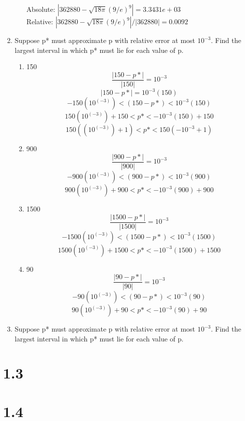 \documentclass{article}
\begin{document}
\begin{enumerate}
\begin{enumerate}
        Absolute: $|362880-\sqrt{18\pi}(9/e)^{9}| =3.3431e+03 $\\
         Relative: $|362880-\sqrt{18\pi}(9/e)^{9}|/|362880| = 0.0092$
    \end{enumerate}
    \item Suppose p* must approximate p with relative error at most $10^{-3}$. Find the largest interval in which p* must lie for each value of p. 
    \begin{enumerate}
        \item 150
        $$\frac{|150 - p*|}{|150|} = 10^{-3}$$
        $$|150 - p*| = 10^{-3}(150)$$
         $$-150(10^(-3)) < (150 - p*) < 10^{-3}(150)$$
         $$150(10^(-3)) + 150 < p* < -10^{-3}(150) + 150$$
         $$150((10^(-3)) + 1)< p* < 150(-10^{-3} + 1)$$
        \item 900
        $$\frac{|900 - p*|}{|900|} = 10^{-3}$$
        $$-900(10^(-3)) < (900 - p*) < 10^{-3}(900)$$
        $$900(10^(-3)) + 900 < p* < -10^{-3}(900) + 900$$
        \item 1500
        $$\frac{|1500 - p*|}{|1500|} = 10^{-3}$$
        $$-1500(10^(-3)) < (1500 - p*) < 10^{-3}(1500)$$
        $$1500(10^(-3)) + 1500 < p* < -10^{-3}(1500) + 1500$$
        \item 90
        $$\frac{|90 - p*|}{|90|} = 10^{-3}$$
        $$-90(10^(-3)) < (90 - p*) < 10^{-3}(90)$$
        $$90(10^(-3)) + 90 < p* < -10^{-3}(90) + 90$$
    \end{enumerate}
    \item Suppose p* must approximate p with relative error at most $10^{-3}$. Find the largest interval in which p* must lie for each value of p.
\end{enumerate}
\section{1.3}
\section{1.4}
\end{document}
